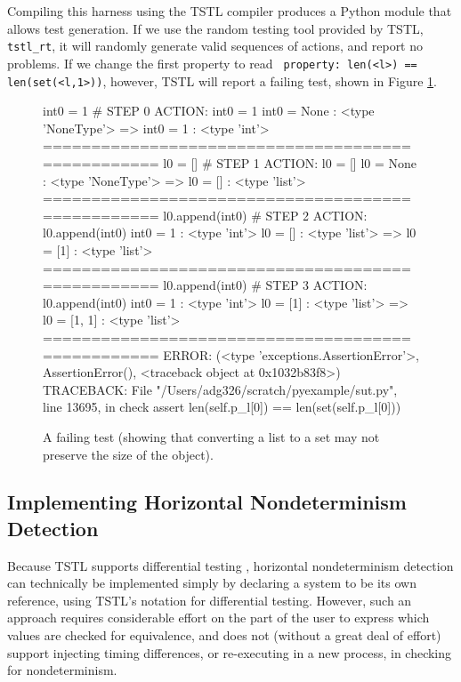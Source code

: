 Compiling this harness using
the TSTL compiler produces a Python module that allows test
generation.  If we use the random testing tool provided by TSTL, {\tt
  tstl\_rt}, it will randomly generate valid sequences of actions, and
report no problems.  If we change the first property to read {\tt
  property: len(<l>) == len(set(<l,1>))}, however, TSTL will report a
failing test, shown in Figure \ref{fig:setlistfail}.

\begin{figure}
{\scriptsize
\begin{code}
int0 = 1                                                                 \# STEP 0
ACTION: int0 = 1 
int0 = None : <type 'NoneType'>
=> int0 = 1 : <type 'int'>
==================================================
l0 = []                                                                  \# STEP 1
ACTION: l0 = [] 
l0 = None : <type 'NoneType'>
=> l0 = [] : <type 'list'>
==================================================
l0.append(int0)                                                          \# STEP 2
ACTION: l0.append(int0) 
int0 = 1 : <type 'int'>
l0 = [] : <type 'list'>
=> l0 = [1] : <type 'list'>
==================================================
l0.append(int0)                                                          \# STEP 3
ACTION: l0.append(int0) 
int0 = 1 : <type 'int'>
l0 = [1] : <type 'list'>
=> l0 = [1, 1] : <type 'list'>
==================================================
ERROR: (<type 'exceptions.AssertionError'>,
  AssertionError(), <traceback object at 0x1032b83f8>)
TRACEBACK:
  File "/Users/adg326/scratch/pyexample/sut.py",
  line 13695, in check
    assert len(self.p\_l[0]) == len(set(self.p\_l[0]))
\end{code}
}
\caption{A failing test (showing that converting a list to a set may
  not preserve the size of the object).}
\label{fig:setlistfail}
\end{figure}

\subsection{Implementing Horizontal Nondeterminism Detection}
\label{sec:horizimp}

Because TSTL supports differential testing \cite{tstlsttt}, horizontal
nondeterminism detection can technically be implemented simply by
declaring a system to be its own reference, using TSTL's notation for
differential testing.  However, such an approach requires considerable effort
on the part of the user to express which values are checked for
equivalence, and does not (without a great deal of effort) support injecting timing differences,
or re-executing in a new process, in checking for nondeterminism.

